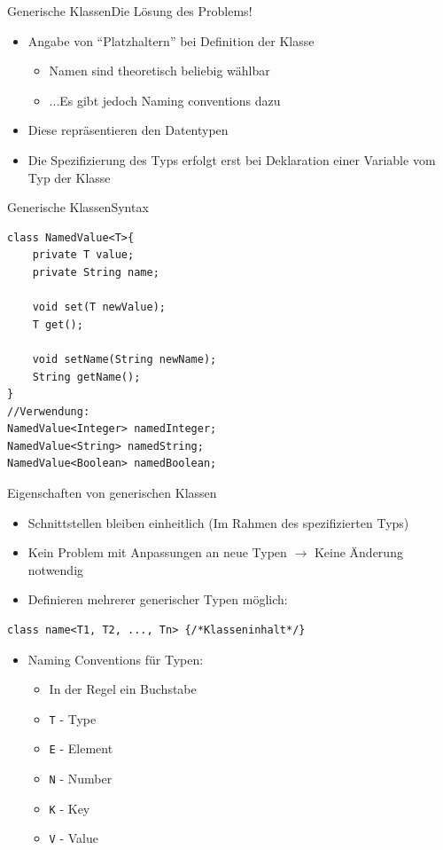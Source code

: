\begin{frame}{Generische Klassen}{Die Lösung des Problems!}
    \begin{itemize}
        \item Angabe von "`Platzhaltern"' bei Definition der Klasse
        \begin{itemize}
            \item Namen sind theoretisch beliebig wählbar
            \item ...Es gibt jedoch Naming conventions dazu
        \end{itemize}
        \item Diese repräsentieren den Datentypen
        \item Die Spezifizierung des Typs erfolgt erst bei Deklaration einer Variable vom Typ der Klasse
    \end{itemize}
\end{frame}

\begin{frame}[fragile]{Generische Klassen}{Syntax}
\lstset{style=javacode}
\begin{lstlisting}
class NamedValue<T>{
    private T value;
    private String name;
    
    void set(T newValue);
    T get();
    
    void setName(String newName);
    String getName();
}
//Verwendung:
NamedValue<Integer> namedInteger;
NamedValue<String> namedString;
NamedValue<Boolean> namedBoolean;
\end{lstlisting}
\end{frame}

\begin{frame}{Eigenschaften von generischen Klassen}
\begin{itemize}
    \item Schnittstellen bleiben einheitlich (Im Rahmen des spezifizierten Typs)
    \item Kein Problem mit Anpassungen an neue Typen $\rightarrow$ Keine Änderung notwendig
    \item Definieren mehrerer generischer Typen möglich:
\end{itemize}%
\lstset{style=javacode}%
\begin{lstlisting}
class name<T1, T2, ..., Tn> {/*Klasseninhalt*/}
\end{lstlisting}
\framebreak
\begin{itemize}
\item Naming Conventions für Typen:
    \begin{itemize}
        \item In der Regel ein Buchstabe
        \item \texttt{T} - Type
        \item \texttt{E} - Element
        \item \texttt{N} - Number
        \item \texttt{K} - Key
        \item \texttt{V} - Value
    \end{itemize}
\end{itemize}
\end{frame}

